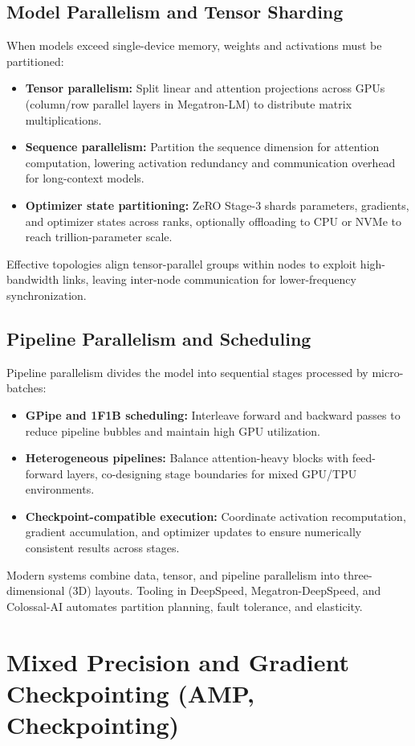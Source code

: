 \documentclass{article}
\begin{document}
\subsection{Model Parallelism and Tensor Sharding}
When models exceed single-device memory, weights and activations must be partitioned:
\begin{itemize}
  \item \textbf{Tensor parallelism:} Split linear and attention projections across GPUs (column/row parallel layers in Megatron-LM) to distribute matrix multiplications.
  \item \textbf{Sequence parallelism:} Partition the sequence dimension for attention computation, lowering activation redundancy and communication overhead for long-context models.
  \item \textbf{Optimizer state partitioning:} ZeRO Stage-3 shards parameters, gradients, and optimizer states across ranks, optionally offloading to CPU or NVMe to reach trillion-parameter scale.
\end{itemize}
Effective topologies align tensor-parallel groups within nodes to exploit high-bandwidth links, leaving inter-node communication for lower-frequency synchronization.

\subsection{Pipeline Parallelism and Scheduling}
Pipeline parallelism divides the model into sequential stages processed by micro-batches:
\begin{itemize}
  \item \textbf{GPipe and 1F1B scheduling:} Interleave forward and backward passes to reduce pipeline bubbles and maintain high GPU utilization.
  \item \textbf{Heterogeneous pipelines:} Balance attention-heavy blocks with feed-forward layers, co-designing stage boundaries for mixed GPU/TPU environments.
  \item \textbf{Checkpoint-compatible execution:} Coordinate activation recomputation, gradient accumulation, and optimizer updates to ensure numerically consistent results across stages.
\end{itemize}
Modern systems combine data, tensor, and pipeline parallelism into three-dimensional (3D) layouts. Tooling in DeepSpeed, Megatron-DeepSpeed, and Colossal-AI automates partition planning, fault tolerance, and elasticity.

\section{Mixed Precision and Gradient Checkpointing (AMP, Checkpointing)}
\end{document}
